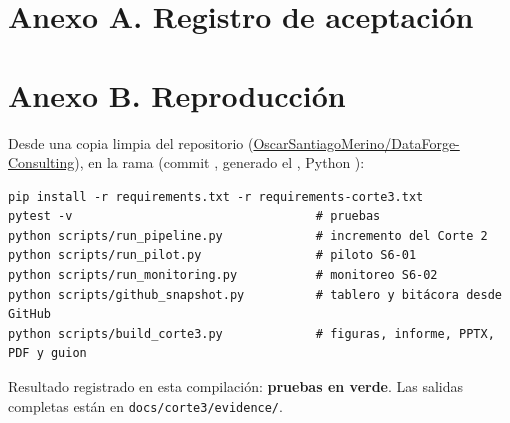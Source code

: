 \documentclass[10pt,a4paper]{article}
\newcommand{\repo}{\href{https://github.com/OscarSantiagoMerino/DataForge-Consulting}{OscarSantiagoMerino/DataForge-Consulting}}
\begin{document}
\clearpage
\appendix
\section*{Anexo A. Registro de aceptación}


\section*{Anexo B. Reproducción}
Desde una copia limpia del repositorio (\repo), en la rama \texttt{\Rama} (commit \texttt{\SHA}, generado el \Generado, Python \PyVer):
\begin{verbatim}
pip install -r requirements.txt -r requirements-corte3.txt
pytest -v                                  # pruebas
python scripts/run_pipeline.py             # incremento del Corte 2
python scripts/run_pilot.py                # piloto S6-01
python scripts/run_monitoring.py           # monitoreo S6-02
python scripts/github_snapshot.py          # tablero y bitácora desde GitHub
python scripts/build_corte3.py             # figuras, informe, PPTX, PDF y guion
\end{verbatim}
Resultado registrado en esta compilación: \textbf{\Tests{} pruebas en verde}. Las salidas completas están en \texttt{docs/corte3/evidence/}.

\begin{table}[h]
\caption{Detalle del monitoreo semanal (\texttt{monitoring\_report.csv})}

\end{table}
\end{document}
